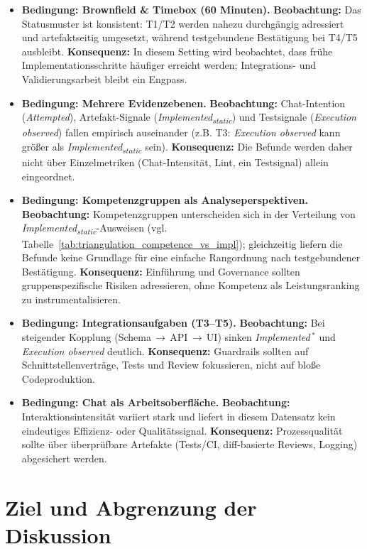 \begin{itemize}
	\item \textbf{Bedingung: Brownfield \& Timebox (60 Minuten).} \textbf{Beobachtung:} Das Statusmuster ist konsistent: T1/T2 werden nahezu durchgängig adressiert und artefaktseitig umgesetzt, während testgebundene Bestätigung bei T4/T5 ausbleibt. \textbf{Konsequenz:} In diesem Setting wird beobachtet, dass frühe Implementationsschritte häufiger erreicht werden; Integrations- und Validierungsarbeit bleibt ein Engpass.
	\item \textbf{Bedingung: Mehrere Evidenzebenen.} \textbf{Beobachtung:} Chat-Intention (\textit{Attempted}), Artefakt-Signale (\textit{Implemented\textsubscript{static}}) und Testsignale (\textit{Execution observed}) fallen empirisch auseinander (z.B. T3: \textit{Execution observed} kann größer als \textit{Implemented\textsubscript{static}} sein). \textbf{Konsequenz:} Die Befunde werden daher nicht über Einzelmetriken (Chat-Intensität, Lint, ein Testsignal) allein eingeordnet.
	\item \textbf{Bedingung: Kompetenzgruppen als Analyseperspektiven.} \textbf{Beobachtung:} Kompetenzgruppen unterscheiden sich in der Verteilung von \textit{Implemented\textsubscript{static}}-Ausweisen (vgl. Tabelle~\ref{tab:triangulation_competence_vs_impl}); gleichzeitig liefern die Befunde keine Grundlage für eine einfache Rangordnung nach testgebundener Bestätigung. \textbf{Konsequenz:} Einführung und Governance sollten gruppenspezifische Risiken adressieren, ohne Kompetenz als Leistungsranking zu instrumentalisieren.
	\item \textbf{Bedingung: Integrationsaufgaben (T3--T5).} \textbf{Beobachtung:} Bei steigender Kopplung (Schema\,$\rightarrow$\,API\,$\rightarrow$\,UI) sinken  \textit{Implemented}\,$^\ast$ und  \textit{Execution observed} deutlich. \textbf{Konsequenz:} Guardrails sollten auf Schnittstellenverträge, Tests und Review fokussieren, nicht auf bloße Codeproduktion.
	\item \textbf{Bedingung: Chat als Arbeitsoberfläche.} \textbf{Beobachtung:} Interaktionsintensität variiert stark und liefert in diesem Datensatz kein eindeutiges Effizienz- oder Qualitätssignal. \textbf{Konsequenz:} Prozessqualität sollte über überprüfbare Artefakte (Tests/CI, diff-basierte Reviews, Logging) abgesichert werden.
\end{itemize}

\section{Ziel und Abgrenzung der Diskussion}
\label{sec:discussion_scope}

